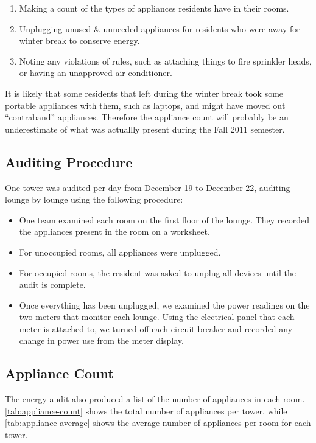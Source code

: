 \begin{enumerate}
\item Making a count of the types of appliances residents have in their rooms.
\item Unplugging unused \& unneeded appliances for residents who were away for winter break to conserve energy.
\item Noting any violations of rules, such as attaching things to fire sprinkler heads, or having an unapproved air conditioner.
\end{enumerate}

It is likely that some residents that left during the winter break took some portable appliances with them, such as laptops, and might have moved out ``contraband'' appliances. Therefore the appliance count will probably be an underestimate of what was actuallly present during the Fall 2011 semester.


\subsection{Auditing Procedure}

One tower was audited per day from December 19 to December 22, auditing lounge by lounge using the following procedure:

\begin{itemize}
	\item One team examined each room on the first floor of the lounge. They recorded the appliances present in the room on a worksheet.
	\item For unoccupied rooms, all appliances were unplugged.
	\item For occupied rooms, the resident was asked to unplug all devices until the audit is complete.
	\item Once everything has been unplugged, we examined the power readings on the two meters that monitor each lounge. Using the electrical panel that each meter is attached to, we turned off each circuit breaker and recorded any change in power use from the meter display.
\end{itemize}


\subsection{Appliance Count}
\label{sec:appliance-count}

The energy audit also produced a list of the number of appliances in each room. \autoref{tab:appliance-count} shows the total number of appliances per tower, while \autoref{tab:appliance-average} shows the average number of appliances per room for each tower.

